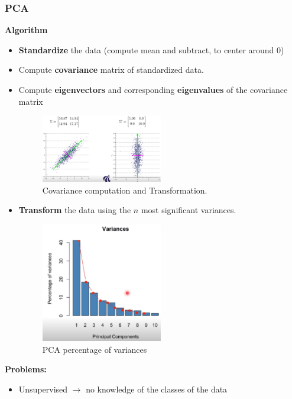 \documentclass[a4paper]{article}
\begin{document}
\subsubsection{PCA}
\textbf{Algorithm} 
\begin{itemize}
	\item \textbf{Standardize} the data (compute mean and subtract, to center around 0)
	\item Compute \textbf{covariance}  matrix of standardized data. 
	\item Compute \textbf{eigenvectors} and corresponding \textbf{eigenvalues}  of the covariance matrix
		\begin{figure}[H]
		\centering
		\includegraphics[width=0.5\textwidth]{figures/PCA_cov.png}
		\caption{Covariance computation and Transformation.}
		\label{fig:pca_cov}
		\end{figure} 
		
	\item \textbf{Transform}  the data using the $ n $ most significant variances.
		\begin{figure}[H]
		\centering
		\includegraphics[width=0.5\textwidth]{figures/PCA_variance_order.png}
		\caption{PCA percentage of variances}
		\label{fig:pca_variances}
		\end{figure} 
\end{itemize}

\textbf{Problems:} 
\begin{itemize}
	\item Unsupervised $ \rightarrow $ no knowledge of the classes of the data
\end{itemize}
\end{document}
